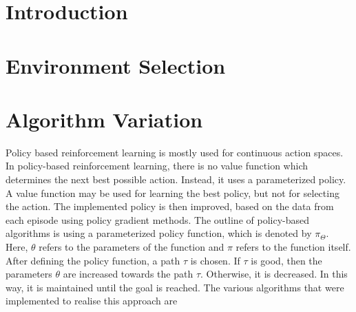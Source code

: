\documentclass{article}
\begin{document}

\begin{abstract}

\end{abstract}

\section {Introduction}

\section {Environment Selection}

\section{Algorithm Variation}
Policy based reinforcement learning is mostly used for continuous action spaces. In policy-based reinforcement learning, there is no value function which determines the next best possible action. Instead, it uses a parameterized policy. A value function may be used for learning the best policy, but not for selecting the action. The implemented policy is then improved, based on the data from each episode using policy gradient methods. \cite{sutton-barlo}
The outline of policy-based algorithms is using a parameterized policy function, which is denoted by $\pi_\Theta$. 
Here, $\theta$ refers to the parameters of the function and $\pi$ refers to the function itself. After defining the policy function, a path $\tau$ is chosen. If $\tau$ is good, then the parameters $\theta$ are increased towards the path $\tau$. Otherwise, it is decreased. In this way, it is maintained until the goal is reached.    \cite{plaat-deeprl}
The various algorithms that were implemented to realise this approach are
\end{document}
